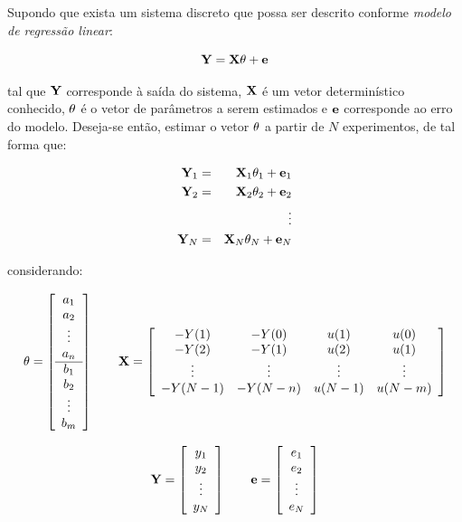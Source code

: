 Supondo que exista um sistema discreto que possa ser descrito conforme {\it
modelo de regressão linear}:

\begin{equation}\label{eq:mode_reg_lin}
\mathbf{Y} = \mathbf{X\theta} + \mathbf{e}
\end{equation}

\noindent tal que $\mathbf{Y}$ corresponde à saída do sistema, $\mathbf{X}$ é um vetor
determinístico conhecido, $\mathbf{\theta}$ é o vetor de parâmetros a serem
estimados e $\mathbf{e}$ corresponde ao erro do modelo. Deseja-se então, estimar o
vetor $\mathbf{\theta}$ a partir de $N$ experimentos, de tal forma que:

\begin{eqnarray}
\mathbf{Y}_1 & = & \mathbf{X}_1\mathbf{\theta}_1 + \mathbf{e}_1\nonumber\\
\mathbf{Y}_2 & = & \mathbf{X}_2\mathbf{\theta}_2 + \mathbf{e}_2\nonumber\\
& & \vdots\nonumber\\ 
\mathbf{Y}_N & = & \mathbf{X}_N\mathbf{\theta}_N + \mathbf{e}_N\nonumber
\end{eqnarray}

\noindent considerando:

\begin{equation*}
\mathbf{\theta} = \left[
\begin{array}{c}
a_1\\
a_2\\
\vdots\\
a_n\\
\hline
b_1\\
b_2\\
\vdots\\
b_m
\end{array}
\right] \qquad
\mathbf{X} = \left[
\begin{array}{cccc}
-Y(1) & -Y(0) & u(1) & u(0)\\
-Y(2) & -Y(1) & u(2) & u(1)\\
\vdots & \vdots & \vdots & \vdots\\
-Y(N-1) & -Y(N-n) & u(N-1) & u(N-m)
\end{array}
\right]
\end{equation*}

\begin{equation*}
\mathbf{Y} = \left[
\begin{array}{c}
y_1\\
y_2\\
\vdots\\
y_N
\end{array}
\right] \qquad
\mathbf{e} = \left[
\begin{array}{c}
e_1\\
e_2\\
\vdots\\
e_N
\end{array}
\right]
\end{equation*}


